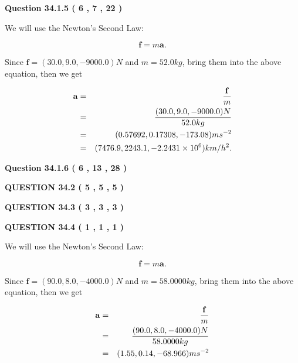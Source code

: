 \documentclass[12pt]{article}
\begin{document}
{\textbf{\Large{Question
34.1.5 
 (           6 ,           7 ,          22 )
}}}
  
  
 
 

We will use the Newton's Second Law:
 
\[
\mathbf{f}=m\mathbf{a}.
\]
 
Since $\mathbf{f}=( %
30.0,  %
9.0,  %
-9000.0 )N$
and $m= %
52.0 kg$, bring them into the above equation, then we get
 
\begin{eqnarray*}
\mathbf{a}&=&\frac{\mathbf{f}}m  \\
&=&\frac{(
30.0 ,
9.0 ,
-9000.0 )N
}{ %
52.0 kg}  \\
&=&(
0.57692 ,
0.17308,
-173.08
)ms^{-2} \\
&=&(
7476.9 ,
2243.1 ,
-2.2431 \times 10^{6}
)km/h^2.
\end{eqnarray*}
 
 
 
  
\vspace{0.2in}
  
{\textbf{\Large{Question
34.1.6 
 (           6 ,          13 ,          28 )
}}}
  
  
  
\vspace{0.2in}
  
{\textbf{\Large{QUESTION
34.2 
 (           5 ,           5 ,           5 )
}}}
  
  
  
\vspace{0.2in}
  
{\textbf{\Large{QUESTION
34.3 
 (           3 ,           3 ,           3 )
}}}
  
  
  
\vspace{0.2in}
  
{\textbf{\Large{QUESTION
34.4 
 (           1 ,           1 ,           1 )
}}}
  
  


 
 

We will use the Newton's Second Law:
 
\[
\mathbf{f}=m\mathbf{a}.
\]
 
Since $\mathbf{f}= %
(90.0 , 8.0 , -4000.0) N$
and $m= %
58.0000kg$, bring them into the above equation, then we get
 
\begin{eqnarray*}
\mathbf{a}&=&\frac{\mathbf{f}}m  \\
&=&\frac{ %
(90.0 , 8.0 , -4000.0) N}{ %
58.0000kg}  \\
&=& %
(1.55 , 0.14 , -68.966) ms^{-2}
\end{eqnarray*}
 
\end{document}

